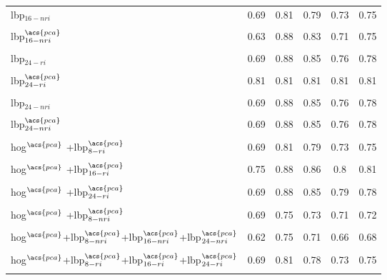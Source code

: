 \begin{table*}
{\begin{tabular}{l ccccc}
  \acs{lbp}$_{16-nri}$ & 0.69 & 0.81 & 0.79 & 0.73 & 0.75\\
  \multicolumn{6}{c}{}\\[-1.5ex] 

  \acs{lbp}$_{16-nri}^{\acs{pca}}$ & 0.63 & 0.88 & 0.83 & 0.71 & 0.75\\
  \multicolumn{6}{c}{}\\[-1.5ex]   

  \acs{lbp}$_{24-ri}$ & 0.69 & 0.88 & 0.85 & 0.76 & 0.78\\
  \multicolumn{6}{c}{}\\[-1.5ex] 
 
  \acs{lbp}$_{24-ri}^{\acs{pca}}$ & 0.81 & 0.81 & 0.81 & 0.81 & 0.81\\
  \multicolumn{6}{c}{}\\[-1.5ex]  

  \acs{lbp}$_{24-nri}$ & 0.69 & 0.88 & 0.85 & 0.76 & 0.78\\
  \multicolumn{6}{c}{}\\[-1.5ex] 

  \acs{lbp}$_{24-nri}^{\acs{pca}}$ & 0.69 & 0.88 & 0.85 & 0.76 & 0.78\\
  \multicolumn{6}{c}{}\\[-1.5ex]     

   \acs{hog}$^{\acs{pca}}$ +\acs{lbp}$_{8-ri}^{\acs{pca}}$ & 0.69 & 0.81 & 0.79 & 0.73 & 0.75\\
  \multicolumn{6}{c}{}\\[-1.5ex]
  
   \acs{hog}$^{\acs{pca}}$ +\acs{lbp}$_{16-ri}^{\acs{pca}}$ & 0.75 & 0.88 & 0.86 & 0.8 & 0.81\\
  \multicolumn{6}{c}{}\\[-1.5ex]
  
   \acs{hog}$^{\acs{pca}}$ +\acs{lbp}$_{24-ri}^{\acs{pca}}$ & 0.69 & 0.88 & 0.85 & 0.79 & 0.78\\
  \multicolumn{6}{c}{}\\[-1.5ex]

 \acs{hog}$^{\acs{pca}}$ +\acs{lbp}$_{8-nri}^{\acs{pca}}$ & 0.69 & 0.75 & 0.73 & 0.71 & 0.72\\
  \multicolumn{6}{c}{}\\[-1.5ex]
  
  \acs{hog}$^{\acs{pca}}$+\acs{lbp}$_{8-nri}^{\acs{pca}}$+\acs{lbp}$_{16-nri}^{\acs{pca}}$+\acs{lbp}$_{24-nri}^{\acs{pca}}$ & 0.62 & 0.75 & 0.71 & 0.66 & 0.68 \\
  \multicolumn{6}{c}{}\\[-1.5ex]

  \acs{hog}$^{\acs{pca}}$+\acs{lbp}$_{8-ri}^{\acs{pca}}$+\acs{lbp}$_{16-ri}^{\acs{pca}}$+\acs{lbp}$_{24-ri}^{\acs{pca}}$ & 0.69 & 0.81 & 0.78 & 0.73 & 0.75 \\
  \multicolumn{6}{c}{}\\[-1.5ex]
 
\bottomrule
\end{tabular}}
\end{table*}


